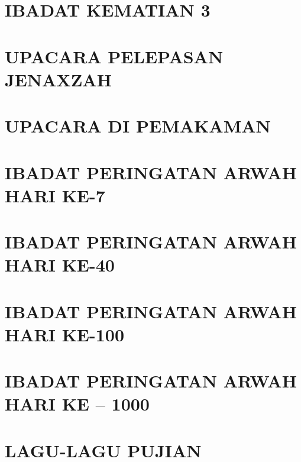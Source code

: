 \documentclass[10pt,a5paper,openany,fancyhdr]{memoir}
\begin{document}
\chapter{IBADAT KEMATIAN 3} 


\chapter{UPACARA PELEPASAN JENAXZAH}
%

\chapter{UPACARA DI PEMAKAMAN} 
%

\chapter{IBADAT PERINGATAN ARWAH HARI KE-7} 
%

\chapter{IBADAT PERINGATAN ARWAH HARI KE-40} 


\chapter{IBADAT PERINGATAN ARWAH HARI KE-100}

 
\chapter{IBADAT PERINGATAN ARWAH HARI KE – 1000} 
%


\chapter*{LAGU-LAGU PUJIAN}

\end{document}
